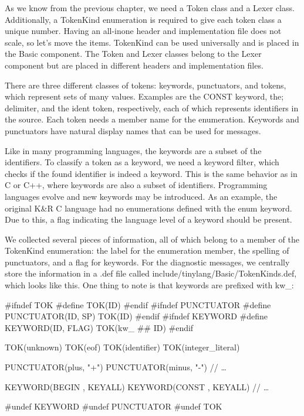 As we know from the previous chapter, we need a Token class and a Lexer class. Additionally, a TokenKind enumeration is required to give each token class a unique number. Having an all-inone header and implementation file does not scale, so let’s move the items. TokenKind can be used universally and is placed in the Basic component. The Token and Lexer classes belong to the Lexer component but are placed in different headers and implementation files.

There are three different classes of tokens: keywords, punctuators, and tokens, which represent sets of many values. Examples are the CONST keyword, the; delimiter, and the ident token, respectively, each of which represents identifiers in the source. Each token needs a member name for the enumeration. Keywords and punctuators have natural display names that can be used for messages.

Like in many programming languages, the keywords are a subset of the identifiers. To classify a token as a keyword, we need a keyword filter, which checks if the found identifier is indeed a keyword. This is the same behavior as in C or C++, where keywords are also a subset of identifiers. Programming languages evolve and new keywords may be introduced. As an example, the original K\&R C language had no enumerations defined with the enum keyword. Due to this, a flag indicating the language level of a keyword should be present.

We collected several pieces of information, all of which belong to a member of the TokenKind enumeration: the label for the enumeration member, the spelling of punctuators, and a flag for keywords. For the diagnostic messages, we centrally store the information in a .def file called include/tinylang/Basic/TokenKinds.def, which looks like this. One thing to note is that keywords are prefixed with kw\_:

\begin{cpp}
#ifndef TOK
#define TOK(ID)
#endif
#ifndef PUNCTUATOR
#define PUNCTUATOR(ID, SP) TOK(ID)
#endif
#ifndef KEYWORD
#define KEYWORD(ID, FLAG) TOK(kw_ ## ID)
#endif

TOK(unknown)
TOK(eof)
TOK(identifier)
TOK(integer_literal)

PUNCTUATOR(plus, "+")
PUNCTUATOR(minus, "-")
// …

KEYWORD(BEGIN , KEYALL)
KEYWORD(CONST , KEYALL)
// …

#undef KEYWORD
#undef PUNCTUATOR
#undef TOK
\end{cpp}

